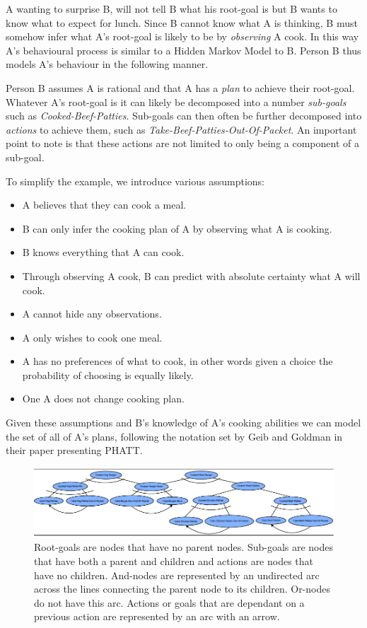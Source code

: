 \documentclass[parskip]{cs4rep}
\begin{document}
A wanting to surprise B, will not tell B what his root-goal is but B wants to know what to expect for lunch. Since B cannot know what A is thinking, B must somehow infer what A's root-goal is likely to be by \textit{observing} A cook. In this way A's behavioural process is similar to a Hidden Markov Model to B. Person B thus models A's behaviour in the following manner. 

Person B assumes A is rational and that A has a \textit{plan} to achieve their root-goal. Whatever A's root-goal is it can likely be decomposed into a number \textit{sub-goals} such as \textit{Cooked-Beef-Patties}. Sub-goals can then often be further decomposed into \textit{actions} to achieve them, such as \textit{Take-Beef-Patties-Out-Of-Packet}. An important point to note is that these actions are not limited to only being a component of a sub-goal.

To simplify the example, we introduce various assumptions:

\begin{itemize}
\item
A believes that they can cook a meal.
\item
B can only infer the cooking plan of A by observing what A is cooking.
\item
B knows everything that A can cook.
\item
Through observing A cook, B can predict with absolute certainty what A will cook.
\item
A cannot hide any observations.
\item
A only wishes to cook one meal.
\item
A has no preferences of what to cook, in other words given a choice the probability of choosing is equally likely.
\item
One A does not change cooking plan.
\end{itemize}

Given these assumptions and B's knowledge of A's cooking abilities we can model the set of all of A's plans, following the notation set by Geib and Goldman in their paper presenting PHATT.

\begin{figure}[h]
\centerline{
	\includegraphics{images/example-plan-library}
}
\caption{Root-goals are nodes that have no parent nodes. Sub-goals are nodes that have both a parent and children and actions are nodes that have no children. And-nodes are represented by an undirected arc across the lines connecting the parent node to its children. Or-nodes do not have this arc. Actions or goals that are dependant on a previous action are represented by an arc with an arrow.}
\label{fig:example-plan-library}
\end{figure}
\end{document}
